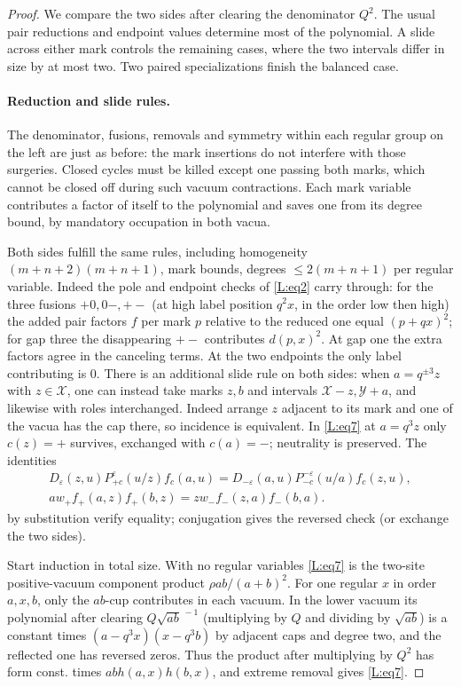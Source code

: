 \documentclass[11pt]{article}
\numberwithin{equation}{section}
\theoremstyle{definition}\newtheorem{definition}[theorem]{Definition}
\theoremstyle{remark}\newtheorem{remark}[theorem]{Remark}
\begin{document}
\begin{proof}
We compare the two sides after clearing the denominator $Q^2$.
The usual pair reductions and endpoint values determine most of the
polynomial. A slide across either mark controls the remaining cases,
where the two intervals differ in size by at most two. Two paired
specializations finish the balanced case.

\paragraph{Reduction and slide rules.} The denominator, fusions, removals and symmetry within each regular group on the left are just as before: the mark insertions do not interfere with those surgeries. Closed cycles must be killed except one passing both marks, which cannot be closed off during such vacuum contractions. Each mark variable contributes a factor of itself to the polynomial and saves one from its degree bound, by mandatory occupation in both vacua.

Both sides fulfill the same rules, including homogeneity \((m+n+2)(m+n+1)\), mark bounds, degrees \(\le2(m+n+1)\) per regular variable. Indeed the pole and endpoint checks of \eqref{L:eq2} carry through: for the three fusions \(+0,0-,+-\) (at high label position \(q^2x\), in the order low then high) the added pair factors \(f\) per mark \(p\) relative to the reduced one equal \((p+qx)^2\); for gap three the disappearing \(+-\) contributes \(d(p,x)^2\). At gap one the extra factors agree in the canceling terms. At the two endpoints the only label contributing is 0. There is an additional slide rule on both sides: when \(a=q^{\pm3} z\) with \(z\in\mathcal X\), one can instead take marks \(z,b\) and intervals \(\mathcal X-z,\mathcal Y+a\), and likewise with roles interchanged. Indeed arrange \(z\) adjacent to its mark and one of the vacua has the cap there, so incidence is equivalent. In \eqref{L:eq7} at \(a=q^3z\) only \(c(z)=+\) survives, exchanged with \(c(a)=-\); neutrality is preserved. The identities
\[
\begin{gathered}
 D_\varepsilon(z,u)P^\varepsilon_{+c}(u/z) f_c(a,u)
 =D_{-\varepsilon}(a,u)P^{-\varepsilon}_{-c}(u/a) f_c(z,u),\\
 a w_+ f_+(a,z) f_+(b,z)= z w_- f_-(z,a) f_-(b,a).
\end{gathered}
\]
by substitution verify equality; conjugation gives the reversed check (or exchange the two sides).



Start induction in total size. With no regular variables \eqref{L:eq7} is the two-site positive-vacuum component product \(\rho ab/(a+b)^2\). For one regular \(x\) in order \(a,x,b\), only the \(ab\)-cup contributes in each vacuum. In the lower vacuum its polynomial after clearing \(Q\sqrt{ab}^{\,-1}\) (multiplying by \(Q\) and dividing by \(\sqrt{ab}\)) is a constant times \((a-q^3x)(x-q^3 b)\) by adjacent caps and degree two, and the reflected one has reversed zeros. Thus the product after multiplying by \(Q^2\) has form const. times \(ab h(a,x)h(b,x)\), and extreme removal gives \eqref{L:eq7}.


\end{proof}
\end{document}
